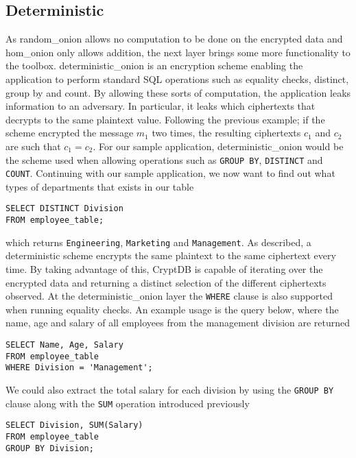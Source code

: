 \subsection{Deterministic}
\label{sec:det}

As \Gls{random_onion} allows no computation to be done on the encrypted data and \gls{hom_onion} only allows addition, the next layer brings some more functionality to the toolbox. \Gls{deterministic_onion} is an encryption scheme enabling the application to perform standard SQL operations such as equality checks, distinct, group by and count. By allowing these sorts of computation, the application leaks information to an adversary. In particular, it leaks which ciphertexts that decrypts to the same plaintext value. Following the previous example; if the scheme encrypted the message $m_1$ two times, the resulting ciphertexts $c_1$ and $c_2$ are such that $c_1 = c_2$. For our sample application, \Gls{deterministic_onion} would be the scheme used when allowing operations such as \verb!GROUP BY!, \verb!DISTINCT! and \verb!COUNT!. Continuing with our sample application, we now want to find out what types of departments that exists in our table

\begin{verbatim}
SELECT DISTINCT Division
FROM employee_table;
\end{verbatim}
\noindent
which returns \verb!Engineering!, \verb!Marketing! and \verb!Management!. As described, a deterministic scheme encrypts the same plaintext to the same ciphertext every time. By taking advantage of this, CryptDB is capable of iterating over the encrypted data and returning a distinct selection of the different ciphertexts observed. At the \gls{deterministic_onion} layer the \verb!WHERE! clause is also supported when running equality checks. An example usage is the query below, where the name, age and salary of all employees from the management division are returned

\begin{verbatim}
SELECT Name, Age, Salary
FROM employee_table
WHERE Division = 'Management';
\end{verbatim}

\noindent
We could also extract the total salary for each division by using the \verb!GROUP BY! clause along with the \verb!SUM! operation introduced previously

\begin{verbatim}
SELECT Division, SUM(Salary)
FROM employee_table
GROUP BY Division;
\end{verbatim}

